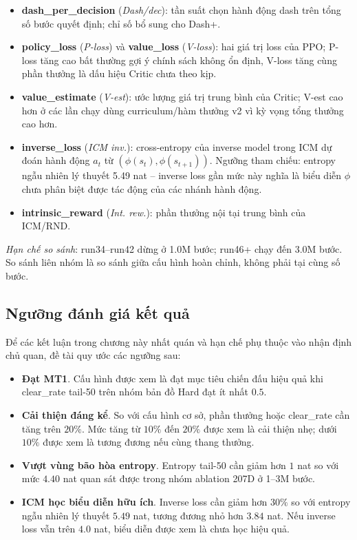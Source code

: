 \begin{itemize}
    \item \textbf{dash\_per\_decision} (\textit{Dash/dec}): tần suất chọn hành động dash trên tổng số bước quyết định; chỉ số bổ sung cho Dash+.
    \item \textbf{policy\_loss} (\textit{P-loss}) và \textbf{value\_loss} (\textit{V-loss}): hai giá trị loss của PPO; P-loss tăng cao bất thường gợi ý chính sách không ổn định, V-loss tăng cùng phần thưởng là dấu hiệu Critic chưa theo kịp.
    \item \textbf{value\_estimate} (\textit{V-est}): ước lượng giá trị trung bình của Critic; V-est cao hơn ở các lần chạy dùng curriculum/hàm thưởng v2 vì kỳ vọng tổng thưởng cao hơn.
    \item \textbf{inverse\_loss} (\textit{ICM inv.}): cross-entropy của inverse model trong ICM dự đoán hành động $a_t$ từ $(\phi(s_t), \phi(s_{t+1}))$. Ngưỡng tham chiếu: entropy ngẫu nhiên lý thuyết 5.49 nat -- inverse loss gần mức này nghĩa là biểu diễn $\phi$ chưa phân biệt được tác động của các nhánh hành động.
    \item \textbf{intrinsic\_reward} (\textit{Int. rew.}): phần thưởng nội tại trung bình của ICM/RND.
\end{itemize}

\textit{Hạn chế so sánh}: run34--run42 dừng ở 1.0M bước; run46+ chạy đến 3.0M bước. So sánh liên nhóm là so sánh giữa cấu hình hoàn chỉnh, không phải tại cùng số bước.

\subsection{Ngưỡng đánh giá kết quả}
\label{sec:eval_thresholds}

Để các kết luận trong chương này nhất quán và hạn chế phụ thuộc vào nhận định chủ quan, đề tài quy ước các ngưỡng sau:

\begin{itemize}
    \item \textbf{Đạt MT1}. Cấu hình được xem là đạt mục tiêu chiến đấu hiệu quả khi clear\_rate tail-50 trên nhóm bản đồ Hard đạt ít nhất $0.5$.
    \item \textbf{Cải thiện đáng kể}. So với cấu hình cơ sở, phần thưởng hoặc clear\_rate cần tăng trên $20\%$. Mức tăng từ $10\%$ đến $20\%$ được xem là cải thiện nhẹ; dưới $10\%$ được xem là tương đương nếu cùng thang thưởng.
    \item \textbf{Vượt vùng bão hòa entropy}. Entropy tail-50 cần giảm hơn $1$ nat so với mức $4.40$ nat quan sát được trong nhóm ablation 207D ở 1--3M bước.
    \item \textbf{ICM học biểu diễn hữu ích}. Inverse loss cần giảm hơn $30\%$ so với entropy ngẫu nhiên lý thuyết $5.49$ nat, tương đương nhỏ hơn $3.84$ nat. Nếu inverse loss vẫn trên $4.0$ nat, biểu diễn được xem là chưa học hiệu quả.
\end{itemize}

